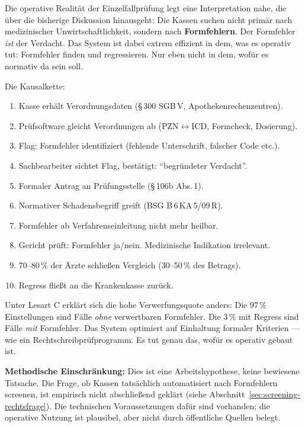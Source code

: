 \documentclass{umbruch-position}
\begin{document}
Die operative Realität der Einzelfallprüfung legt eine Interpretation nahe, die über die bisherige Diskussion hinausgeht: Die Kassen suchen nicht primär nach medizinischer Unwirtschaftlichkeit, sondern nach \textbf{Formfehlern}. Der Formfehler \textit{ist} der Verdacht. Das System ist dabei extrem effizient in dem, was es operativ tut: Formfehler finden und regressieren. Nur eben nicht in dem, wofür es normativ da sein soll.

Die Kausalkette:

\begin{enumerate}[nosep]
  \item Kasse erhält Verordnungsdaten (\S\,300 SGB\,V, Apothekenrechenzentren).
  \item Prüfsoftware gleicht Verordnungen ab (PZN$\leftrightarrow$ICD, Formcheck, Dosierung).
  \item Flag: Formfehler identifiziert (fehlende Unterschrift, falscher Code etc.).
  \item Sachbearbeiter sichtet Flag, bestätigt: ``begründeter Verdacht''.
  \item Formaler Antrag an Prüfungsstelle (\S\,106b Abs.\,1).
  \item Normativer Schadensbegriff greift (BSG B\,6\,KA\,5/09\,R).
  \item Formfehler ab Verfahrenseinleitung nicht mehr heilbar.
  \item Gericht prüft: Formfehler ja/nein. Medizinische Indikation irrelevant.
  \item 70--80\,\% der Ärzte schließen Vergleich (30--50\,\% des Betrags).
  \item Regress fließt an die Krankenkasse zurück.
\end{enumerate}

Unter Lesart C erklärt sich die hohe Verwerfungsquote anders: Die 97\,\% Einstellungen sind Fälle \textit{ohne} verwertbaren Formfehler. Die 3\,\% mit Regress sind Fälle \textit{mit} Formfehler. Das System optimiert auf Einhaltung formaler Kriterien --- wie ein Rechtschreibprüfprogramm. Es tut genau das, wofür es operativ gebaut ist.

\textbf{Methodische Einschränkung:} Dies ist eine Arbeitshypothese, keine bewiesene Tatsache. Die Frage, ob Kassen tatsächlich automatisiert nach Formfehlern screenen, ist empirisch nicht abschließend geklärt (siehe Abschnitt~\ref{sec:screening-rechtsfrage}). Die technischen Voraussetzungen dafür sind vorhanden; die operative Nutzung ist plausibel, aber nicht durch öffentliche Quellen belegt.
\end{document}
